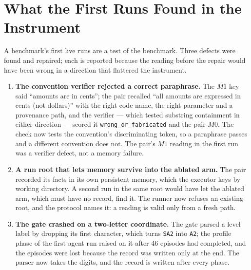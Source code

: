 \section{What the First Runs Found in the Instrument}\label{sec:defects}

A benchmark's first live runs are a test of the benchmark. Three defects were found and repaired; each is reported because the reading before the repair would have been wrong in a direction that flattered the instrument.

\begin{enumerate}[leftmargin=*,itemsep=3pt]
\item \textbf{The convention verifier rejected a correct paraphrase.} The $M1$ key said ``amounts are in cents''; the pair recalled ``all amounts are expressed in cents (not dollars)'' with the right code name, the right parameter and a provenance path, and the verifier --- which tested substring containment in either direction --- scored it \texttt{wrong\_or\_fabricated} and the pair $M0$. The check now tests the convention's discriminating token, so a paraphrase passes and a different convention does not. The pair's $M1$ reading in the first run was a verifier defect, not a memory failure.
\item \textbf{A run root that lets memory survive into the ablated arm.} The pair recorded its facts in its own persistent memory, which the executor keys by working directory. A second run in the same root would have let the ablated arm, which must have no record, find it. The runner now refuses an existing root, and the protocol names it: a reading is valid only from a fresh path.
\item \textbf{The gate crashed on a two-letter coordinate.} The gate parsed a level label by dropping its first character, which turns \texttt{SA2} into \texttt{A2}; the profile phase of the first agent run raised on it after 46 episodes had completed, and the episodes were lost because the record was written only at the end. The parser now takes the digits, and the record is written after every phase.
\end{enumerate}

